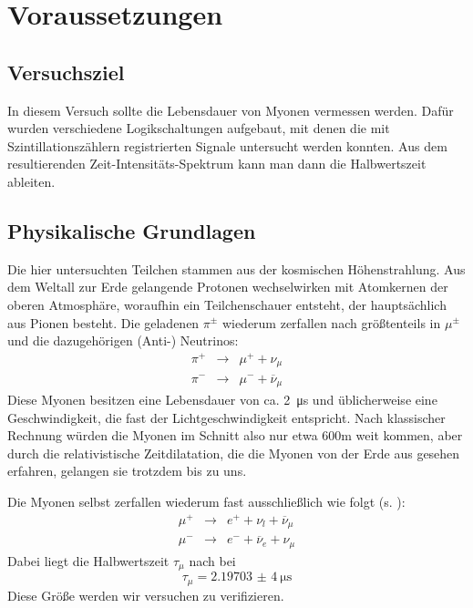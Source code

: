 \section{Voraussetzungen}

\subsection{Versuchsziel}

In diesem Versuch sollte die Lebensdauer von Myonen vermessen werden. Dafür
wurden verschiedene Logikschaltungen aufgebaut, mit denen die mit
Szintillationszählern registrierten Signale untersucht werden konnten. Aus dem
resultierenden Zeit-Intensitäts-Spektrum kann man dann die Halbwertszeit
ableiten.

\subsection{Physikalische Grundlagen}

Die hier untersuchten Teilchen stammen aus der kosmischen Höhenstrahlung. Aus dem Weltall zur Erde gelangende Protonen wechselwirken mit Atomkernen der
oberen Atmosphäre, woraufhin ein Teilchenschauer entsteht, der hauptsächlich
aus Pionen besteht. Die geladenen $π^{\pm}$ wiederum zerfallen nach
\cite[Gl.16]{script} größtenteils in
$μ^{\pm}$ und die dazugehörigen (Anti-) Neutrinos:
\begin{eqnarray}
π^+ &\rightarrow& μ^+ + ν_μ\\
π^- &\rightarrow& μ^- + \overline{ν}_μ
\end{eqnarray}
Diese Myonen besitzen eine Lebensdauer von ca. \SI{2}{\micro\second} und
üblicherweise eine Geschwindigkeit, die fast der Lichtgeschwindigkeit
entspricht. Nach klassischer Rechnung würden die Myonen im Schnitt also nur
etwa 600m weit kommen, aber durch die relativistische Zeitdilatation, die die
Myonen von der Erde aus gesehen erfahren, gelangen sie trotzdem bis zu uns.

Die Myonen selbst zerfallen wiederum fast ausschließlich wie folgt (s.
\cite[Gl.5]{script}):
\begin{eqnarray}
μ^+ &\rightarrow& e^+ + ν_l + \overline{ν}_μ\\
μ^- &\rightarrow& e^- + \overline{ν}_e + ν_μ
\end{eqnarray}
Dabei liegt die Halbwertszeit $τ_μ$ nach \cite[Gl.4]{script} bei
\begin{equation}
τ_μ = \SI{2,19703(4)}{\micro\second} 
\label{eqn:tau_mu_theo}
\end{equation}
Diese Größe werden wir versuchen zu verifizieren.

